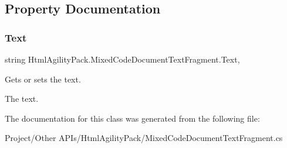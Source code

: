 \subsection{Property Documentation}
\mbox{\label{class_html_agility_pack_1_1_mixed_code_document_text_fragment_a97688fad96ae0ed3c6510e76321532e3}} 
\subsubsection{\texorpdfstring{Text}{Text}}
{\footnotesize\ttfamily string Html\+Agility\+Pack.\+Mixed\+Code\+Document\+Text\+Fragment.\+Text\hspace{0.3cm}{\ttfamily [get]}, {\ttfamily [set]}}



Gets or sets the text. 

The text.

The documentation for this class was generated from the following file\+:\begin{DoxyCompactItemize}
\item 
Project/\+Other A\+P\+Is/\+Html\+Agility\+Pack/Mixed\+Code\+Document\+Text\+Fragment.\+cs\end{DoxyCompactItemize}
